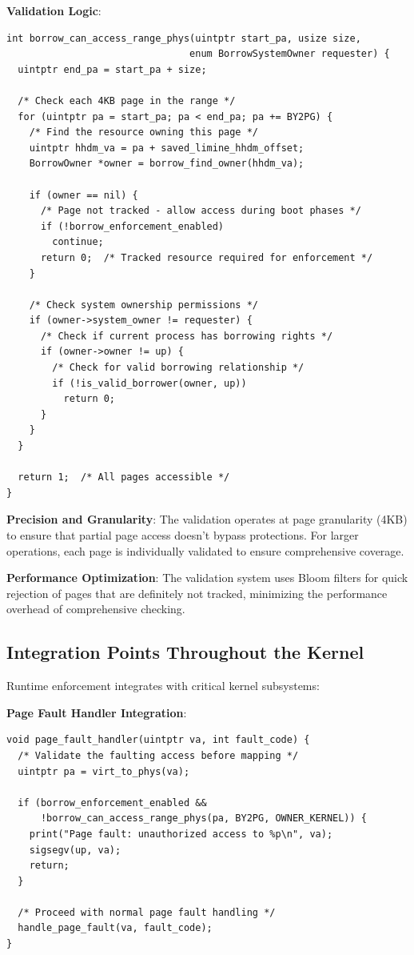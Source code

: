 \documentclass[11pt,letterpaper]{article}
\begin{document}
\textbf{Validation Logic}:

\begin{lstlisting}
int borrow_can_access_range_phys(uintptr start_pa, usize size,
                                enum BorrowSystemOwner requester) {
  uintptr end_pa = start_pa + size;
  
  /* Check each 4KB page in the range */
  for (uintptr pa = start_pa; pa < end_pa; pa += BY2PG) {
    /* Find the resource owning this page */
    uintptr hhdm_va = pa + saved_limine_hhdm_offset;
    BorrowOwner *owner = borrow_find_owner(hhdm_va);
    
    if (owner == nil) {
      /* Page not tracked - allow access during boot phases */
      if (!borrow_enforcement_enabled)
        continue;
      return 0;  /* Tracked resource required for enforcement */
    }
    
    /* Check system ownership permissions */
    if (owner->system_owner != requester) {
      /* Check if current process has borrowing rights */
      if (owner->owner != up) {
        /* Check for valid borrowing relationship */
        if (!is_valid_borrower(owner, up))
          return 0;
      }
    }
  }
  
  return 1;  /* All pages accessible */
}
\end{lstlisting}

\textbf{Precision and Granularity}: The validation operates at page granularity (4KB) to ensure that partial page access doesn't bypass protections. For larger operations, each page is individually validated to ensure comprehensive coverage.

\textbf{Performance Optimization}: The validation system uses Bloom filters for quick rejection of pages that are definitely not tracked, minimizing the performance overhead of comprehensive checking.

\subsection{Integration Points Throughout the Kernel}

Runtime enforcement integrates with critical kernel subsystems:

\textbf{Page Fault Handler Integration}:

\begin{lstlisting}
void page_fault_handler(uintptr va, int fault_code) {
  /* Validate the faulting access before mapping */
  uintptr pa = virt_to_phys(va);
  
  if (borrow_enforcement_enabled && 
      !borrow_can_access_range_phys(pa, BY2PG, OWNER_KERNEL)) {
    print("Page fault: unauthorized access to %p\n", va);
    sigsegv(up, va);
    return;
  }
  
  /* Proceed with normal page fault handling */
  handle_page_fault(va, fault_code);
}
\end{lstlisting}
\end{document}
